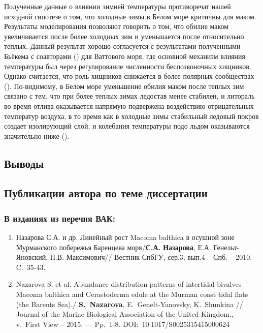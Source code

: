 {Полученные данные о влиянии зимней температуры противоречат нашей исходной гипотезе о том, что холодные зимы в Белом море критичны для маком. 
Результаты моделирования позволяют говорить о том, что обилие маком увеличивается после более холодных зим и уменьшается после относительно теплых. 
Данный результат хорошо согласуется с результатами полученными Бьёкема с соавторами (\cite{Beukema_et_al_1998, Beukema_et_al_2009}) для Ваттового моря, где основной механизм влияния температуры был через регулирование численности беспозвоночных хищников.  
Однако считается, что роль хищников снижается в более полярных сообществах (\cite{Pianka_1966, Freestone_et_al_2011}). 
По-видимому, в Белом море уменьшение обилия маком после теплых зим связано с тем, что при более теплых зимах ледостав менее стабилен, и литораль во время отлива оказывается напрямую подвержена воздействию отрицательных температур воздуха, в то время как в холодные зимы стабильный ледовый покров создает изолирующий слой, и колебания температуры подо льдом оказываются значительно ниже (\cite{Kuznecov_1960}).
%

\subsection*{Выводы}


\begin{small}
\section*{Публикации автора по теме диссертации}
\subsubsection*{В изданиях из перечня ВАК:}
\begin{enumerate}
\item Назарова С.А. и др. Линейный рост Macoma balthica в осушной зоне Мурманского побережья Баренцева моря/\textbf{С.А. Назарова}, Е.А.  Генельт-Яновский,  Н.В. Максимович// Вестник СпбГУ, сер.3, вып.4 -- Спб. -- 2010. -- C.~35-43.
\item  Nazarova S. et al. Abundance distribution patterns of intertidal bivalves Macoma balthica and Cerastoderma edule at the Murman coast tidal flats (the Barents Sea)./ \textbf{S.~Nazarova}, E.~Genelt-Yanovsky, K.~Shunkina // Journal of the Marine Biological Association of the United Kingdom., v.~First View -- 2015. — Pp.~1-8. DOI:~10.1017/S0025315415000624
\end{enumerate}


\end{small}}
